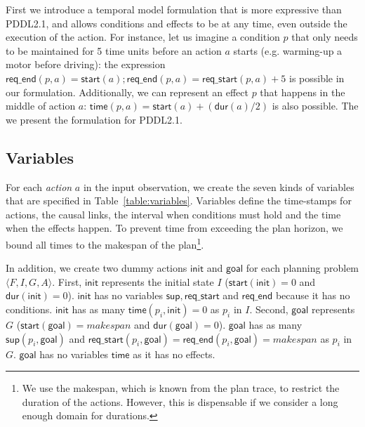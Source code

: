 \documentclass[runningheads]{llncs}
\newcommand{\tup}[1]{{\langle #1 \rangle}}
\newcommand{\dur}{\mathsf{dur}}    %
\newcommand{\start}{\mathsf{start}}%
\newcommand{\supp}{\mathsf{sup}}   %
\newcommand{\tim}{\mathsf{time}}   %
\newcommand{\reqs}{\mathsf{req\_{start}}} %
\newcommand{\reqe}{\mathsf{req\_{end}}}   %
\newcommand{\ini}{\mathsf{init}}   %
\newcommand{\goal}{\mathsf{goal}}  %
\begin{document}
First we introduce a temporal model formulation that is more expressive than PDDL2.1, and allows conditions and effects to be at any time, even outside the execution of the action. For instance, let us imagine a condition $p$ that only needs to be maintained for 5 time units before an action $a$ starts (e.g. warming-up a motor before driving): the expression $\reqe(p,a)=\start(a); \reqe(p,a) = \reqs(p,a)+5$ is possible in our formulation. Additionally, we can represent an effect $p$ that happens in the middle of action $a$: $\tim(p,a) = \start(a)+ (\dur(a) / 2)$ is also possible. The we present the formulation for PDDL2.1.


\subsection{Variables}

For each {\em action} $a$ in the input observation, we create the seven kinds of variables that are specified in Table~\ref{table:variables}. Variables define the time-stamps for actions, the causal links, the interval when conditions must hold and the time when the effects happen. To prevent time from exceeding the plan horizon, we bound all times to the makespan of the plan\footnote{We use the makespan, which is known from the plan trace, to restrict the duration of the actions. However, this is dispensable if we consider a long enough domain for durations.}.

In addition, we create two dummy actions $\ini$ and $\goal$ for each planning problem $\tup{F,I,G,A}$. First, $\ini$ represents the initial state $I$ ($\start(\ini)=0$ and $\dur(\ini)=0$). $\ini$ has no variables $\supp, \reqs$ and $\reqe$ because it has no conditions. $\ini$ has as many $\tim(p_i,\ini)=0$ as $p_i$ in $I$. Second, $\goal$ represents $G$ ($\start(\goal)=makespan$ and $\dur(\goal)=0$). $\goal$ has as many $\supp(p_i,\goal)$ and $\reqs(p_i,\goal)=\reqe(p_i,\goal)=makespan$ as $p_i$ in $G$. $\goal$ has no variables $\tim$ as it has no effects.
\end{document}
